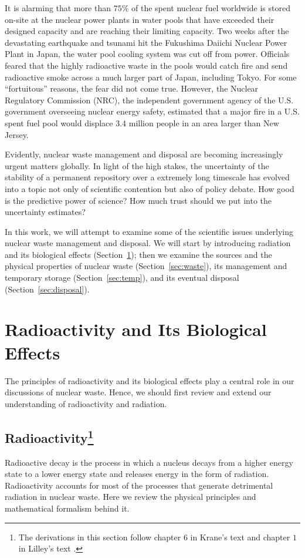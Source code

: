 \documentclass[nofootinbib,preprint,aps]{revtex4-1}
\begin{document}
It is alarming that more than $75\%$ of the spent nuclear fuel worldwide is stored on-site at the nuclear power plants
in water pools that have exceeded their designed capacity and are reaching their limiting capacity.\cite{aa12}
Two weeks after the devastating earthquake and tsunami hit the Fukushima Daiichi Nuclear Power Plant in Japan,
the water pool cooling system was cut off from power. Officials feared that
the highly radioactive waste in the pools would catch fire and send radioactive smoke
across a much larger part of Japan, including Tokyo.\cite{s16} For some ``fortuitous'' reasons, the fear did not come true.
However, the Nuclear Regulatory Commission (NRC), the independent government agency
of the U.S. government overseeing nuclear energy safety,
estimated that a major fire in a U.S. spent fuel pool would
displace 3.4 million people in an area larger than New Jersey.\cite{s16}

Evidently, nuclear waste management and disposal are becoming increasingly urgent matters globally.
In light of the high stakes,
the uncertainty of the stability of a permanent repository over a extremely long timescale has evolved into 
a topic not only of scientific contention but also of policy debate.
How good is the predictive power of science? How much trust should we put into the uncertainty estimates?

In this work, we will attempt to examine some of the scientific issues underlying nuclear waste management
and disposal. We will start by introducing radiation and its biological effects (Section~\ref{sec:phys}); then
we examine the sources and the physical properties of nuclear waste (Section~\ref{sec:waste}),
its management and temporary storage (Section~\ref{sec:temp}), and its eventual disposal (Section~\ref{sec:disposal}).

\section{Radioactivity and Its Biological Effects}
\label{sec:phys}
The principles of radioactivity and its biological effects play a central role in our
discussions of nuclear waste. Hence, we should first review and extend our understanding of 
radioactivity and radiation.
    \subsection{Radioactivity\footnote{
    The derivations in this section follow chapter $6$ in
    Krane's text \cite{k88} and chapter $1$ in Lilley's text \cite{l01}.
    }}
    Radioactive decay is the process in which a nucleus decays from a higher energy state to a lower
    energy state and releases energy in the form of radiation. Radioactivity accounts for
    most of the processes that generate detrimental radiation in nuclear waste.
    Here we review the physical principles and mathematical formalism behind it.
\end{document}
